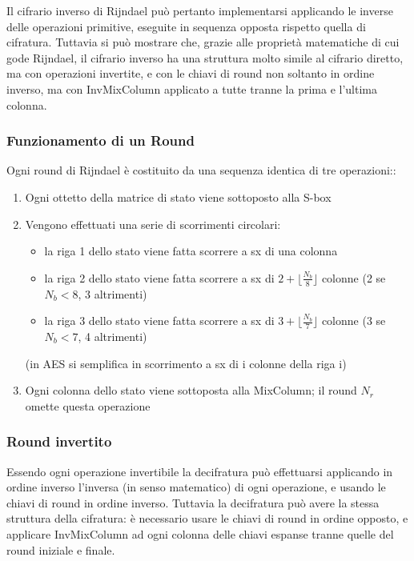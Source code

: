 Il cifrario inverso di Rijndael può pertanto implementarsi applicando le inverse delle operazioni primitive, eseguite in sequenza opposta rispetto quella di cifratura. Tuttavia si può mostrare che, grazie alle proprietà matematiche di cui gode Rijndael, il cifrario inverso ha una struttura molto simile al cifrario diretto, ma con operazioni invertite, e con le chiavi di round non soltanto in ordine inverso, ma con InvMixColumn applicato a tutte tranne la prima e l'ultima colonna.

\subsubsection{Funzionamento di un Round}
Ogni round di Rijndael è costituito da una sequenza identica di tre operazioni::
\begin{enumerate}
  \item Ogni ottetto della matrice di stato viene sottoposto alla S-box
  \item Vengono effettuati una serie di scorrimenti circolari:
  		\begin{itemize}
  			\item la riga 1 dello stato viene fatta scorrere a sx di una colonna
  			\item la riga 2 dello stato viene fatta scorrere a sx di $2 + \lfloor \frac{N_{b}}{8} \rfloor$ colonne (2 se $N_{b} < 8$, 3 altrimenti)
  			\item la riga 3 dello stato viene fatta scorrere a sx di $3 + \lfloor \frac{N_{b}}{7} \rfloor$ colonne (3 se $N_{b} < 7$, 4 altrimenti)
		\end{itemize}
		(in AES si semplifica in scorrimento a sx di i colonne della riga i)
  \item Ogni colonna dello stato viene sottoposta alla MixColumn; il round $N_{r}$ omette questa operazione
\end{enumerate}

\subsubsection{Round invertito}
Essendo ogni operazione invertibile la decifratura può effettuarsi applicando in ordine inverso l'inversa (in senso matematico) di ogni operazione, e usando le chiavi di round in ordine inverso. Tuttavia la decifratura può avere la stessa struttura della cifratura: è necessario usare le chiavi di round in ordine opposto, e applicare InvMixColumn ad ogni colonna delle chiavi espanse tranne quelle del round iniziale e finale.


